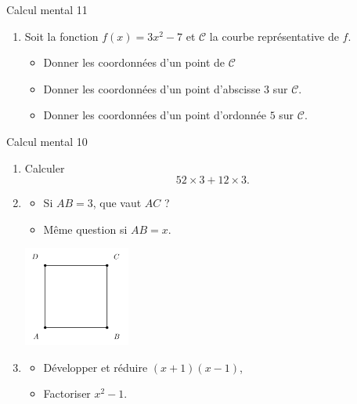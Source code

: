 \documentclass{beamer}
\newcommand{\mC}{\mathcal{C}}
\begin{document}
\begin{frame}{Calcul mental 11}
    \begin{enumerate}
        \item
            Soit la fonction \( f(x)=3x^2-7\) et \( \mC\) la courbe représentative de \( f\).
            \begin{itemize}
                \item Donner les coordonnées d'un point de \( \mC\)
                \item Donner les coordonnées d'un point d'abscisse \( 3\) sur \( \mC\).
                \item Donner les coordonnées d'un point d'ordonnée \( 5\) sur \( \mC\).
            \end{itemize}
    \end{enumerate}
\end{frame}

\begin{frame}{Calcul mental 10}

    \pause

    \begin{enumerate}

        \item
            Calculer
            \begin{equation}
                52\times 3+12\times 3.
            \end{equation}
            \pause

        \item


        \begin{itemize}
            \item Si \( AB=3\), que vaut \( AC\) ?
            \item Même question si \( AB=x\).
        \end{itemize}
            \begin{center}
            \includegraphics[width=3.5cm]{Picture_FIGLabelFigGUEjmmRPICTGUEjmmR-for_eps.png}
            \end{center}

    \item
        \pause
        \begin{itemize}
            \item 
    Développer et réduire $(x+1)(x-1)$, 
\item
    Factoriser $x^2-1$.
        \end{itemize}
    \end{enumerate}
\end{frame}
\end{document}
